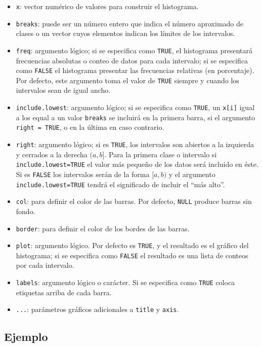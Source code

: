 \documentclass[10pt,]{krantz}
\providecommand{\tightlist}{%
  \setlength{\itemsep}{0pt}\setlength{\parskip}{0pt}}
\begin{document}
\begin{itemize}
\tightlist
\item
  \texttt{x}: vector numérico de valores para construir el histograma.
\item
  \texttt{breaks}: puede ser un número entero que indica el número
  aproximado de clases o un vector cuyos elementos indican los límites
  de los intervalos.
\item
  \texttt{freq}: argumento lógico; si se especifica como \texttt{TRUE},
  el histograma presentará frecuencias absolutas o conteo de datos para
  cada intervalo; si se especifica como \texttt{FALSE} el histograma
  presentar las frecuencias relativas (en porcentaje). Por defecto, este
  argumento toma el valor de \texttt{TRUE} siempre y cuando los
  intervalos sean de igual ancho.
\item
  \texttt{include.lowest}: argumento lógico; si se especifica como
  \texttt{TRUE}, un \texttt{x{[}i{]}} igual a los equal a un valor
  \texttt{breaks} se incluirá en la primera barra, si el argumento
  \texttt{right\ =\ TRUE}, o en la última en caso contrario.
\item
  \texttt{right}: argumento lógico; si es \texttt{TRUE}, los intervalos
  son abiertos a la izquierda y cerrados a la derecha \((a,b]\). Para la
  primera clase o intervalo si \texttt{include.lowest=TRUE} el valor más
  pequeño de los datos será incluido en éste. Si es \texttt{FALSE} los
  intervalos serán de la forma \([a,b)\) y el argumento
  \texttt{include.lowest=TRUE} tendrá el significado de incluir el ``más
  alto''.
\item
  \texttt{col}: para definir el color de las barras. Por defecto,
  \texttt{NULL} produce barras sin fondo.
\item
  \texttt{border}: para definir el color de los bordes de las barras.
\item
  \texttt{plot}: argumento lógico. Por defecto es \texttt{TRUE}, y el
  resultado es el gráfico del histograma; si se especifica como
  \texttt{FALSE} el resultado es una lista de conteos por cada
  intervalo.
\item
  \texttt{labels}: argumento lógico o carácter. Si se especifica como
  \texttt{TRUE} coloca etiquetas arriba de cada barra.
\item
  \texttt{...}: parámetros gráficos adicionales a \texttt{title} y
  \texttt{axis}.
\end{itemize}

\subsection*{Ejemplo}\label{ejemplo-3}
\end{document}
